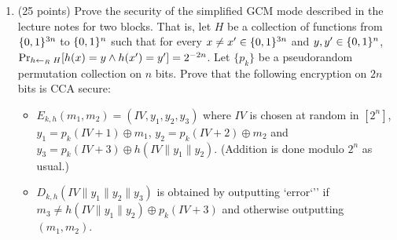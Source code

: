 \documentclass{article}
\begin{document}
\begin{enumerate}[,start=2]
\begin{enumerate}[,label=\alph*.]
\begin{mdbmarginx}{1ex}{0pt}{1ex}{0pt}
\noindent{}Note that $M'$ succeeds with probability at least equal to $M$. In order for $(m', \tau_1')$ to be 
a valid signature for $m'$ under $S_{k_2}$, it must be the case that $\tau$ is a valid signature
for $m'$ under $S'_{k_2,k_3}$.%

Therefore $M'$ can break the security of $S_{k_2}$, which is a contradiction on its CPA security. 
We conclude that $M$ does not exists, and therefore the scheme $S'_{k_2,k_3}$ is CPA secure.%
\end{mdbmarginx}%
\end{enumerate}%

\item{}
(25 points) Prove the security of the simplified GCM mode described in the lecture notes for two blocks. That is, let $H$ be a collection of functions from $\{0,1\}^{3n}$ to $\{0,1\}^n$ such that for every $x\neq x'\in\{0,1\}^{3n}$ and  $y,y'\in\{0,1\}^n$, $\Pr_{h\leftarrow_R\; H}[ h(x)=y \wedge h(x')=y' ]=2^{-2n}$. Let $\{ p_k \}$ be a pseudorandom permutation collection on $n$ bits. Prove that the following encryption on $2n$ bits is CCA secure:%

\begin{itemize}%

\item{}
$E_{k,h}(m_1,m_2) = (IV,y_1,y_2,y_3)$ where $IV$ is chosen at random in $[2^n]$, $y_1=p_k(IV+1)\oplus m_1$, $y_2=p_k(IV+2) \oplus m_2$ and $y_3=p_k(IV+3)\oplus h(IV\|y_1\|y_2)$. (Addition is done modulo $2^n$ as usual.)%

\item{}
$D_{k,h}(IV\|y_1\|y_2\|y_3)$ is obtained by outputting \mdcode{}`error\textquoteleft{}\textquoteright{}' if $m_3 \neq h(IV\|y_1\|y_2)\oplus p_k(IV+3)$ and otherwise outputting $(m_1,m_2)$.%
\end{itemize}%
\end{enumerate}%
\end{document}
